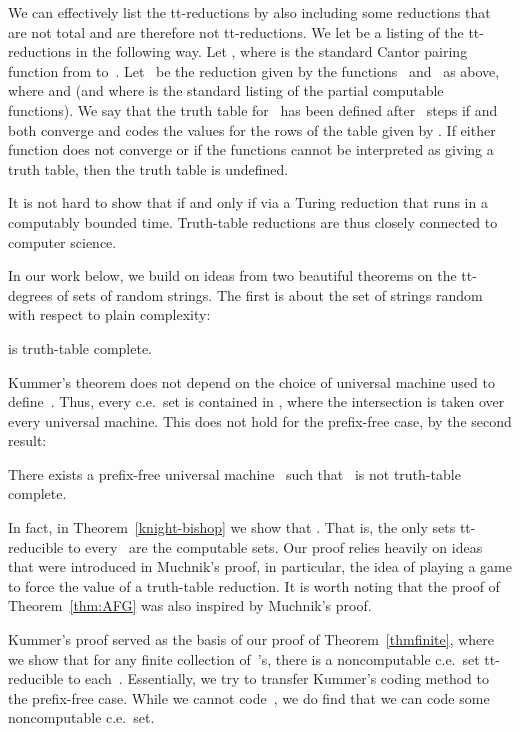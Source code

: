 \documentclass{LMCS}
\newcommand{\0}{\mathbf{0}}
\newcommand{\ce}{c.e.\ }
\newcommand{\<}{\langle}
\renewcommand{\>}{\rangle}
\begin{document}
We can effectively list the tt-reductions by also including some reductions
that are not total and are therefore not tt-reductions.  We let
 be a listing of the tt-reductions in the following
way.  Let , where  is the standard Cantor pairing function from  to~. Let~ be the reduction given by the functions~
and~ as above, where  and  (and where
 is the standard listing of the partial computable
functions).  We say that the truth table for~ has been defined
after~ steps if  and  both converge
and  codes the values for the rows of the table given by
.  If either function does not converge or if the functions
cannot be interpreted as giving a truth table, then the truth table is
undefined.

It is not hard to show that  if and only if  via a Turing
reduction that runs in a computably bounded time.  Truth-table reductions are
thus closely connected to computer science.


In our work below, we build on ideas from two beautiful theorems on the
tt-degrees of sets of random strings. The first is about the set of strings
random with respect to plain complexity:

\begin{thm}\label{KummerThm}
 is truth-table complete.
\end{thm}


\noindent Kummer's theorem does not depend on the choice of universal machine
used to define~.  Thus, every \ce set is contained in , where the intersection is taken over every universal
machine.  This does not hold for the prefix-free case, by the second result:

\begin{thm}\label{MuchnikThm}
There exists a prefix-free universal machine~ such that~ is not
truth-table complete.
\end{thm}

\noindent In fact, in Theorem~\ref{knight-bishop} we show that .  That is, the only sets tt-reducible to
every~ are the computable sets. Our proof relies heavily on ideas
that were introduced in Muchnik's proof, in particular, the idea of playing a
game to force the value of a truth-table reduction. It is worth noting that
the proof of Theorem~\ref{thm:AFG} was also inspired by Muchnik's proof.

Kummer's proof served as the basis of our proof of Theorem~\ref{thmfinite},
where we show that for any finite collection of~'s, there is a
noncomputable \ce set tt-reducible to each~. Essentially, we try to
transfer Kummer's coding method to the prefix-free case. While we cannot
code~, we do find that we can code some noncomputable \ce set.
\end{document}
